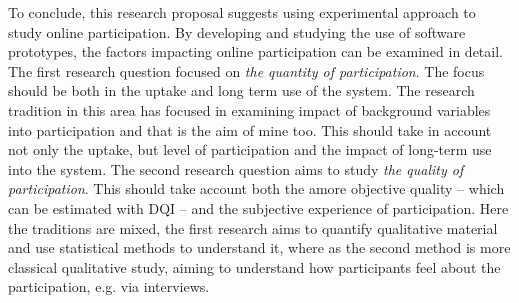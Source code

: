 \documentclass[journal,a4paper]{IEEEtran}
\begin{document}
To conclude, this research proposal suggests using experimental approach to study online participation. By developing and studying the use of software prototypes, the factors impacting online participation can be examined in detail.
The first research question focused on \textit{the quantity of participation}. The focus should be both in the uptake and long term use of the system. The research tradition in this area has focused in examining impact of background variables into participation and that is the aim of mine too. This should take in account not only the uptake, but level of participation and the impact of long-term use into the system.
The second research question aims to study \textit{the quality of participation}. This should take account both the amore objective quality -- which can be estimated with DQI -- and the subjective experience of participation. Here the traditions are mixed, the first research aims to quantify qualitative material and use statistical methods to understand it, where as the second method is more classical qualitative study, aiming to understand how participants feel about the participation, e.g. via interviews.



\end{document}

